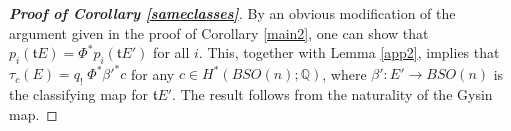 \documentclass[onecolumn,notitlepage,11pt]{article}
\newcommand{\p}{\mathcal{P}}
\newcommand{\Q}{\mathbb{Q}}
\newcommand{\R}{\mathbb{R}}
\newcommand{\Diff}{\mbox{Diff}}
\newcommand{\beq}{\begin{equation*}}
\newcommand{\eeq}{\end{equation*}}
\newtheorem{lemma}{Lemma}[section]
\theoremstyle{definition}
\begin{document}
\begin{proof}[\textbf{Proof of Corollary \ref{sameclasses}}]
By an obvious modification of the argument
given in the proof of Corollary \ref{main2}, one can show
that $p_i(\mathfrak{t}E)=\Phi^*p_i(\mathfrak{t}E')$ for all $i$.
This, together with Lemma \ref{app2}, implies that
$\tau_c(E)=q_!\; \Phi^*\beta'^*c$ for any $c\in H^*(BSO(n);\Q)$,
where $\beta':E'\to BSO(n)$ is
the classifying map for $\mathfrak{t}E'$.
The result follows from the naturality of 
the Gysin map.
\end{proof}

%
\end{document}
